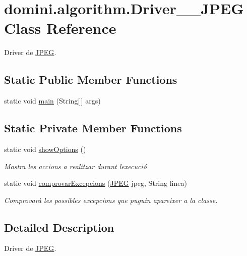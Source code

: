 \hypertarget{classdomini_1_1algorithm_1_1Driver____JPEG}{}\section{domini.\+algorithm.\+Driver\+\_\+\+\_\+\+J\+P\+EG Class Reference}
\label{classdomini_1_1algorithm_1_1Driver____JPEG}


Driver de \hyperlink{classdomini_1_1algorithm_1_1JPEG}{J\+P\+EG}.  


\subsection*{Static Public Member Functions}
\begin{DoxyCompactItemize}
\item 
static void \hyperlink{classdomini_1_1algorithm_1_1Driver____JPEG_a0e1370b743ad9782e31cb6b380dd60a5}{main} (String\mbox{[}$\,$\mbox{]} args)
\end{DoxyCompactItemize}
\subsection*{Static Private Member Functions}
\begin{DoxyCompactItemize}
\item 
static void \hyperlink{classdomini_1_1algorithm_1_1Driver____JPEG_a62ce35e061afe893bd03af9bfff41c33}{show\+Options} ()
\begin{DoxyCompactList}\small\item\em Mostra les accions a realitzar durant l\textquotesingle{}execució \end{DoxyCompactList}\item 
static void \hyperlink{classdomini_1_1algorithm_1_1Driver____JPEG_ae75883665dbbf55adaa8db46f2211c75}{comprovar\+Excepcions} (\hyperlink{classdomini_1_1algorithm_1_1JPEG}{J\+P\+EG} jpeg, String linea)
\begin{DoxyCompactList}\small\item\em Comprovarà les possibles excepcions que puguin apareixer a la classe. \end{DoxyCompactList}\end{DoxyCompactItemize}


\subsection{Detailed Description}
Driver de \hyperlink{classdomini_1_1algorithm_1_1JPEG}{J\+P\+EG}. 

